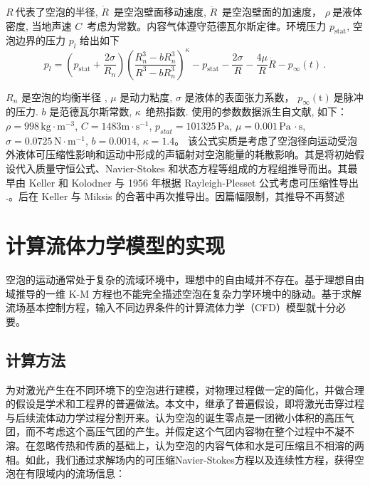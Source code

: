 $R~$代表了空泡的半径, $\dot{R}\,$ 是空泡壁面移动速度, $\ddot{R}\,$
是空泡壁面的加速度， $\rho~$是液体密度, 当地声速 $C\,$
考虑为常数。内容气体遵守范德瓦尔斯定律。环境压力 $p_\mathrm{stat}$,
空泡边界的压力 $p_{l}$ 给出如下
\begin{equation}
    p_{l}=\left(p_{\mathrm {stat}}+\frac{2 \sigma}{R_{n}}\right)\left(\frac{R_{n}^{3}-b R_{n}^{3}}{R^{3}-b R_{n}^{3}}\right)^{\kappa}-p_{\mathrm {stat}}-\frac{2 \sigma}{R}-\frac{4 \mu}{R} \dot{R}-p_\infty(t)\,.
    \label{kmp}
\end{equation}


$R_n$ 是空泡的均衡半径 , $\mu$ 是动力粘度, $\sigma$
是液体的表面张力系数， $p_\infty(\mathrm{t} )~$是脉冲的压力. $b$
是范德瓦尔斯常数, $\kappa\,$ 绝热指数. 使用的参数数据派生自文献\cite{Kroninger2010,delale_bubble_2013,delale_shock_2013}, 如下：$\rho= 998\,\mathrm{kg}\cdot\mathrm{m}^{-3}$, $C=1483\mathrm{m} \cdot \mathrm{s}^{-1}$, $p_{stat} = 101325\,\mathrm{Pa}$, $\mu = 0.001\,\mathrm{Pa\,\cdot s}$, $\sigma = 0.0725\,\mathrm{N}\cdot\mathrm{m}^{-1}$, $b= 0.0014$, $\kappa = 1.4$。
该公式实质是考虑了空泡径向运动受泡外液体可压缩性影响和运动中形成的声辐射对空泡能量的耗散影响。其是将初始假设代入质量守恒公式、Navier-Stokes
和状态方程等组成的方程组推导而出。其最早由 Keller 和 Kolodner 与 1956
年根据 Rayleigh-Plesset 公式考虑可压缩性导出
\cite{keller_damping_1956}.。后在
Keller 与 Miksis
的合著中再次推导出。因篇幅限制，其推导不再赘述\cite{keller_bubble_1980}

\section{计算流体力学模型的实现}\label{chap2.5}

空泡的运动通常处于复杂的流域环境中，理想中的自由域并不存在。基于理想自由域推导的一维
K-M
方程也不能完全描述空泡在复杂力学环境中的脉动。基于求解流场基本控制方程，输入不同边界条件的计算流体力学（CFD）模型就十分必要。
\medskip
\bigskip
\subsection{计算方法}

为对激光产生在不同环境下的空泡进行建模，对物理过程做一定的简化，并做合理的假设是学术和工程界的普遍做法。本文中，继承了普遍假设，即将激光击穿过程与后续流体动力学过程分割开来。认为空泡的诞生零点是一团微小体积的高压气团，而不考虑这个高压气团的产生。并假定这个气团内容物在整个过程中不凝不溶。在忽略传热和传质的基础上，认为空泡的内容气体和水是可压缩且不相溶的两相。如此，我们通过求解场内的可压缩Navier-Stokes方程以及连续性方程，获得空泡在有限域内的流场信息：

